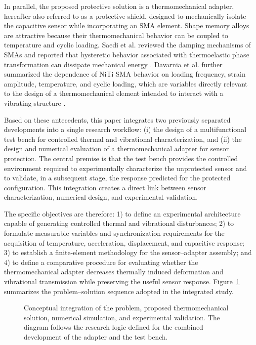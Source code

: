 \documentclass[conference]{IEEEtran}
\begin{document}
In parallel, the proposed protective solution is a thermomechanical adapter, hereafter also referred to as a protective shield, designed to mechanically isolate the capacitive sensor while incorporating an SMA element. Shape memory alloys are attractive because their thermomechanical behavior can be coupled to temperature and cyclic loading. Saedi et al. reviewed the damping mechanisms of SMAs and reported that hysteretic behavior associated with thermoelastic phase transformation can dissipate mechanical energy \cite{Saedi2023}. Davarnia et al. further summarized the dependence of NiTi SMA behavior on loading frequency, strain amplitude, temperature, and cyclic loading, which are variables directly relevant to the design of a thermomechanical element intended to interact with a vibrating structure \cite{Davarnia2025}.

Based on these antecedents, this paper integrates two previously separated developments into a single research workflow: (i) the design of a multifunctional test bench for controlled thermal and vibrational characterization, and (ii) the design and numerical evaluation of a thermomechanical adapter for sensor protection. The central premise is that the test bench provides the controlled environment required to experimentally characterize the unprotected sensor and to validate, in a subsequent stage, the response predicted for the protected configuration. This integration creates a direct link between sensor characterization, numerical design, and experimental validation.

The specific objectives are therefore: 1) to define an experimental architecture capable of generating controlled thermal and vibrational disturbances; 2) to formulate measurable variables and synchronization requirements for the acquisition of temperature, acceleration, displacement, and capacitive response; 3) to establish a finite-element methodology for the sensor--adapter assembly; and 4) to define a comparative procedure for evaluating whether the thermomechanical adapter decreases thermally induced deformation and vibrational transmission while preserving the useful sensor response. Figure~\ref{fig:conceptual} summarizes the problem--solution sequence adopted in the integrated study.


\begin{figure}[t]
\centering
{}
\caption{Conceptual integration of the problem, proposed thermomechanical solution, numerical simulation, and experimental validation. The diagram follows the research logic defined for the combined development of the adapter and the test bench.}
\label{fig:conceptual}
\end{figure}
\end{document}
